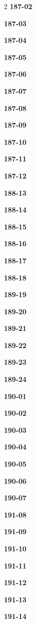 \documentclass[10pt,a4paper]{article}
\begin{document}
\begin{multicols}{2}
\noindent\textbf{187-02}\ \par
\noindent\textbf{187-03}\ \par
\noindent\textbf{187-04}\ \par
\noindent\textbf{187-05}\ \par
\noindent\textbf{187-06}\ \par
\noindent\textbf{187-07}\ \par
\noindent\textbf{187-08}\ \par
\noindent\textbf{187-09}\ \par
\noindent\textbf{187-10}\ \par
\noindent\textbf{187-11}\ \par
\noindent\textbf{187-12}\ \par
\noindent\textbf{188-13}\ \par
\noindent\textbf{188-14}\ \par
\noindent\textbf{188-15}\ \par
\noindent\textbf{188-16}\ \par
\noindent\textbf{188-17}\ \par
\noindent\textbf{188-18}\ \par
\noindent\textbf{189-19}\ \par
\noindent\textbf{189-20}\ \par
\noindent\textbf{189-21}\ \par
\noindent\textbf{189-22}\ \par
\noindent\textbf{189-23}\ \par
\noindent\textbf{189-24}\ \par
\noindent\textbf{190-01}\ \par
\noindent\textbf{190-02}\ \par
\noindent\textbf{190-03}\ \par
\noindent\textbf{190-04}\ \par
\noindent\textbf{190-05}\ \par
\noindent\textbf{190-06}\ \par
\noindent\textbf{190-07}\ \par
\noindent\textbf{191-08}\ \par
\noindent\textbf{191-09}\ \par
\noindent\textbf{191-10}\ \par
\noindent\textbf{191-11}\ \par
\noindent\textbf{191-12}\ \par
\noindent\textbf{191-13}\ \par
\noindent\textbf{191-14}\ \par

\end{multicols}
\end{document}
